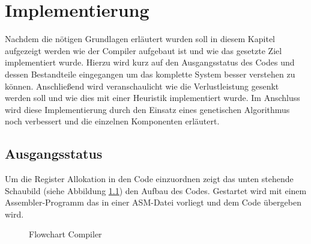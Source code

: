 \chapter{Implementierung}
\label{chap:Implementierung}
Nachdem die nötigen Grundlagen erläutert wurden soll in diesem Kapitel aufgezeigt werden wie der Compiler aufgebaut ist und wie das gesetzte Ziel implementiert wurde. Hierzu wird kurz auf den Ausgangsstatus des Codes und dessen Bestandteile eingegangen um das komplette System besser verstehen zu können. Anschließend wird veranschaulicht wie die Verlustleistung gesenkt werden soll und wie dies mit einer Heuristik implementiert wurde. Im Anschluss wird diese Implementierung durch den Einsatz eines genetischen Algorithmus noch verbessert und die einzelnen Komponenten erläutert.
\section{Ausgangsstatus}
Um die Register Allokation in den Code einzuordnen zeigt das unten stehende Schaubild (siehe Abbildung \ref{fig:flow_compiler}) den Aufbau des Codes. Gestartet wird mit einem Assembler-Programm das in einer ASM-Datei vorliegt und dem Code übergeben wird.


\begin{scriptsize}
	\begin{figure}[htbp] 
		\centering
		
		\caption{Flowchart Compiler}
		\label{fig:flow_compiler}
	\end{figure}
\end{scriptsize}

